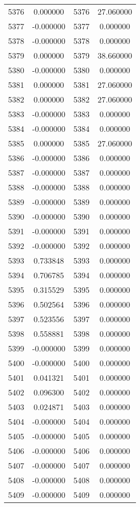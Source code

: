 \documentclass[12pt]{article}
\begin{document}
\begin{longtable}{@{}cccc@{}}
5376 & 0.000000 & 5376 & 27.060000 \\
5377 & -0.000000 & 5377 & 0.000000 \\
5378 & -0.000000 & 5378 & 0.000000 \\
5379 & 0.000000 & 5379 & 38.660000 \\
5380 & -0.000000 & 5380 & 0.000000 \\
5381 & 0.000000 & 5381 & 27.060000 \\
5382 & 0.000000 & 5382 & 27.060000 \\
5383 & -0.000000 & 5383 & 0.000000 \\
5384 & -0.000000 & 5384 & 0.000000 \\
5385 & 0.000000 & 5385 & 27.060000 \\
5386 & -0.000000 & 5386 & 0.000000 \\
5387 & -0.000000 & 5387 & 0.000000 \\
5388 & -0.000000 & 5388 & 0.000000 \\
5389 & -0.000000 & 5389 & 0.000000 \\
5390 & -0.000000 & 5390 & 0.000000 \\
5391 & -0.000000 & 5391 & 0.000000 \\
5392 & -0.000000 & 5392 & 0.000000 \\
5393 & 0.733848 & 5393 & 0.000000 \\
5394 & 0.706785 & 5394 & 0.000000 \\
5395 & 0.315529 & 5395 & 0.000000 \\
5396 & 0.502564 & 5396 & 0.000000 \\
5397 & 0.523556 & 5397 & 0.000000 \\
5398 & 0.558881 & 5398 & 0.000000 \\
5399 & -0.000000 & 5399 & 0.000000 \\
5400 & -0.000000 & 5400 & 0.000000 \\
5401 & 0.041321 & 5401 & 0.000000 \\
5402 & 0.096300 & 5402 & 0.000000 \\
5403 & 0.024871 & 5403 & 0.000000 \\
5404 & -0.000000 & 5404 & 0.000000 \\
5405 & -0.000000 & 5405 & 0.000000 \\
5406 & -0.000000 & 5406 & 0.000000 \\
5407 & -0.000000 & 5407 & 0.000000 \\
5408 & -0.000000 & 5408 & 0.000000 \\
5409 & -0.000000 & 5409 & 0.000000 \\

\end{longtable}
\end{document}
